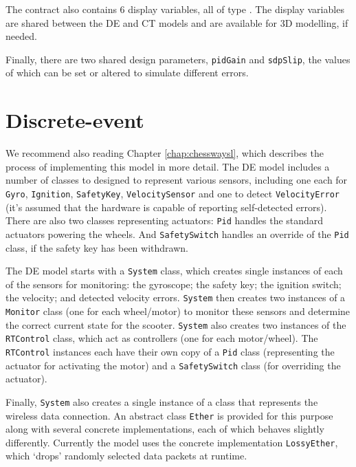 The contract also contains 6 display variables, all of type
{\textbf{}}. The display variables are shared
between the DE and CT models and are available for 3D modelling,
if needed.

Finally, there are two shared design parameters, \texttt{pidGain} and
\texttt{sdpSlip}, the values of which can be set or altered to
simulate different errors.

\section{Discrete-event}  We recommend also reading Chapter \ref{chap:chesswaysl}, which describes the process of implementing this model in more detail.   The DE model includes a number of
classes to designed to represent various sensors, including one each
for \texttt{Gyro}, \texttt{Ignition}, \texttt{SafetyKey},
\texttt{VelocitySensor} and one to detect \texttt{VelocityError} (it's
assumed that the hardware is capable of reporting self-detected
errors). There are also two classes representing actuators:
\texttt{Pid} handles the standard actuators powering the wheels. And
\texttt{SafetySwitch} handles an override of the \texttt{Pid} class,
if the safety key has been withdrawn.

The DE model starts with a \texttt{System} class, which creates
single instances of each of the sensors for monitoring: the
gyroscope; the safety key; the ignition switch; the velocity;
and detected velocity errors. \texttt{System} then creates two
instances of a \texttt{Monitor} class (one for each wheel/motor)
to monitor these sensors and determine the correct current state
for the scooter. \texttt{System} also creates two instances of
the \texttt{RTControl} class, which act as controllers (one for
each motor/wheel). The \texttt{RTControl} instances each have
their own copy of a \texttt{Pid} class (representing the
actuator for activating the motor) and a \texttt{SafetySwitch}
class (for overriding the actuator).

Finally, \texttt{System} also creates a single instance of a
class that represents the wireless data connection. An abstract
class \texttt{Ether} is provided for this purpose along with
several concrete implementations, each of which behaves slightly
differently. Currently the model uses the concrete
implementation \texttt{LossyEther}, which `drops' randomly
selected data packets at runtime.

